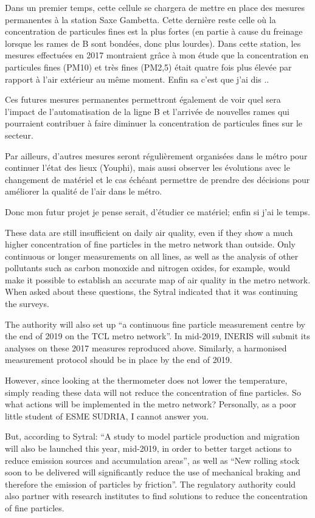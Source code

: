 \documentclass[11pt]{article}
\begin{document}
Dans un premier temps, cette cellule se chargera de mettre en place des
mesures permanentes à la station Saxe Gambetta. Cette dernière reste
celle où la concentration de particules fines est la plus fortes (en
partie à cause du freinage lorsque les rames de B sont bondées, donc
plus lourdes). Dans cette station, les mesures effectuées en 2017
montraient grâce à mon étude que la concentration en particules fines
(PM10) et très fines (PM2,5) était quatre fois plus élevée par rapport à
l'air extérieur au même moment. Enfin sa c'est que j'ai dis ..

Ces futures mesures permanentes permettront également de voir quel sera
l'impact de l'automatisation de la ligne B et l'arrivée de nouvelles
rames qui pourraient contribuer à faire diminuer la concentration de
particules fines sur le secteur.

Par ailleurs, d'autres mesures seront régulièrement organisées dans le
métro pour continuer l'état des lieux (Youphi), mais aussi observer les
évolutions avec le changement de matériel et le cas échéant permettre de
prendre des décisions pour améliorer la qualité de l'air dans le métro.

Donc mon futur projet je pense serait, d'étudier ce matériel; enfin si
j'ai le temps.

    These data are still insufficient on daily air quality, even if they
show a much higher concentration of fine particles in the metro network
than outside. Only continuous or longer measurements on all lines, as
well as the analysis of other pollutants such as carbon monoxide and
nitrogen oxides, for example, would make it possible to establish an
accurate map of air quality in the metro network. When asked about these
questions, the Sytral indicated that it was continuing the surveys.

The authority will also set up ``a continuous fine particle measurement
centre by the end of 2019 on the TCL metro network''. In mid-2019,
INERIS will submit its analyses on these 2017 measures reproduced above.
Similarly, a harmonised measurement protocol should be in place by the
end of 2019.

However, since looking at the thermometer does not lower the
temperature, simply reading these data will not reduce the concentration
of fine particles. So what actions will be implemented in the metro
network? Personally, as a poor little student of ESME SUDRIA, I cannot
answer you.

But, according to Sytral: ``A study to model particle production and
migration will also be launched this year, mid-2019, in order to better
target actions to reduce emission sources and accumulation areas'', as
well as ``New rolling stock soon to be delivered will significantly
reduce the use of mechanical braking and therefore the emission of
particles by friction''. The regulatory authority could also partner
with research institutes to find solutions to reduce the concentration
of fine particles.
\end{document}
